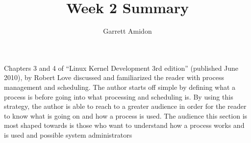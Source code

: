 \documentclass[a4paper]{article}
\title{Week 2 Summary}
\author{Garrett Amidon}
\begin{document}
\maketitle




\paragraph{}

Chapters 3 and 4 of “Linux Kernel Development 3rd edition” (published June 2010), by Robert Love discussed and familiarized the reader with process management and scheduling. The author starts off simple by defining what a process is before going into what processing and scheduling is. By using this strategy, the author is able to reach to a greater audience in order for the reader to know what is going on and how a process is used. The audience this section is most shaped towards is those who want to understand how a process works and is used and possible system administrators
\end{document}
